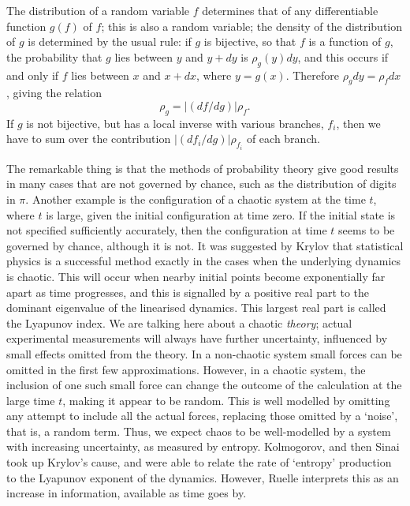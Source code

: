 \documentclass[12pt]{article}
\begin{document}
The distribution of a random variable $f$ determines that of any
differentiable function $g(f)$ of $f$; this is also a random variable;
the density of the distribution of $g$ is determined by the usual rule:
if $g$ is bijective, so that $f$ is a function of $g$,
the probability that $g$ lies between $y$ and $y+dy$
is $\rho_g(y)dy$, and this occurs if and only if $f$ lies between $x$
and $x+dx$, where $y=g(x)$. Therefore $\rho_gdy=\rho_fdx$, giving the
relation
\begin{equation}
\rho_g=|(df/dg)|\rho_f.
\label{change}
\end{equation}
If $g$ is not bijective, but has a local inverse with various branches,
$f_i$, then we have to sum over the contribution $|(df_i/dg)|\rho_{f_i}$
of each branch.


The remarkable thing is that the methods of probability theory give good
results in many cases that are not governed by chance, such as the
distribution of digits in $\pi$. Another example is the
configuration of a chaotic system at the time $t$, where $t$ is large,
given the initial configuration at time zero. If the initial
state is not specified sufficiently accurately, then the configuration at
time $t$ seems to be governed by chance, although it is not.
It was suggested by Krylov \cite{Krylov} that statistical physics is a
successful method exactly in the cases when the underlying
dynamics is chaotic. This will occur when nearby initial points
become exponentially far apart as time progresses, and this is signalled by
a positive
real part to the dominant eigenvalue of the linearised dynamics.
This largest real part is called the Lyapunov index.
We are talking here about a chaotic {\em theory};
actual experimental measurements will always have further uncertainty,
influenced by small
effects omitted from the theory. In a non-chaotic system small
forces can be omitted in the first few approximations. However, in a
chaotic system, the inclusion of one such small force can change the
outcome of the calculation at the large time $t$, making it appear to
be random. This is well modelled by omitting any attempt to include all
the actual forces, replacing those omitted by a `noise', that is, a
random term. Thus, we expect chaos to be well-modelled by a system with
increasing uncertainty, as measured by entropy. Kolmogorov, and then
Sinai took up Krylov's cause, and were able to relate the rate of
`entropy' production to the Lyapunov exponent of the dynamics.
However, Ruelle interprets this 
\cite{Ruelle} as an increase in information, available as time goes by.
\end{document}
